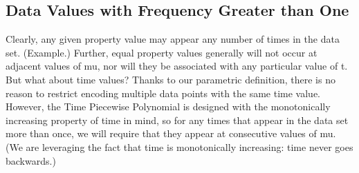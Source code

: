\documentclass{article}
\begin{document}
\subsection{Data Values with Frequency Greater than One}
Clearly, any given property value may appear any number of times in the data set. (Example.) Further, equal property values generally will not occur at adjacent values of mu, nor will they be associated with any particular value of t.
But what about time values? Thanks to our parametric definition, there is no reason to restrict encoding multiple data points with the same time value. However, the Time Piecewise Polynomial is designed with the monotonically increasing property of time in mind, so for any times that appear in the data set more than once, we will require that they appear at consecutive values of mu. 
(We are leveraging the fact that time is monotonically increasing: time never goes backwards.)
\end{document}

